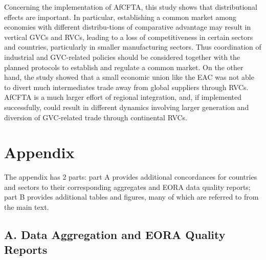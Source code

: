\documentclass[a4paper]{article}
\begin{document}
Concerning the implementation of AfCFTA, this study shows that distributional effects are important. In particular, establishing a common market among economies with different distribu-tions of comparative advantage may result in vertical GVCs and RVCs, leading to a loss of competitiveness in certain sectors and countries, particularly in smaller manufacturing sectors. Thus coordination of industrial and GVC-related policies should be considered together with the planned protocols to establish and regulate a common market. On the other hand, the study showed that a small economic union like the EAC was not able to divert much intermediates trade away from global suppliers through RVCs. AfCFTA is a much larger effort of regional integration, and, if implemented successfully, could result in different dynamics involving larger generation and diversion of GVC-related trade through continental RVCs. 


\newpage




\newpage
\section*{Appendix}

The appendix has 2 parts: part A provides additional concordances for countries and sectors to their corresponding aggregates and EORA data quality reports; part B provides additional tables and figures, many of which are referred to from the main text. %

\subsection*{A. Data Aggregation and EORA Quality Reports}
\setcounter{table}{0}
\renewcommand{\thetable}{A\arabic{table}}
\setcounter{figure}{0}
\renewcommand{\thefigure}{A\arabic{figure}}
\end{document}
